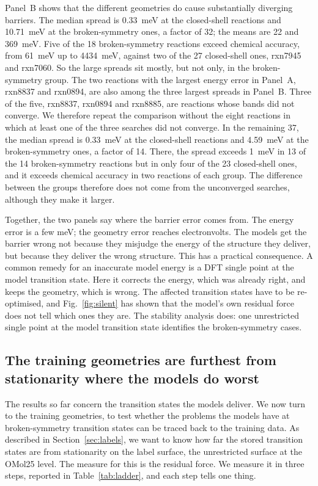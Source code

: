 Panel~B shows that the different geometries do cause substantially
diverging barriers. The median spread is 0.33~meV at the closed-shell
reactions and 10.71~meV at the broken-symmetry ones, a factor of 32; the
means are 22 and 369~meV. Five of the 18 broken-symmetry reactions exceed
chemical accuracy, from 61~meV up to 4434~meV, against two of the 27
closed-shell ones, rxn7945 and rxn7060. So the large spreads sit
mostly, but not only, in the broken-symmetry group. The two reactions with the
largest energy error in Panel~A, rxn8837 and rxn0894, are also among the
three largest spreads in Panel~B. Three of the five, rxn8837, rxn0894
and rxn8885, are reactions whose bands did not converge. We therefore
repeat the comparison without the eight reactions in which at least one
of the three searches did not converge. In the remaining 37, the median
spread is 0.33~meV at the closed-shell reactions and 4.59~meV at the
broken-symmetry ones, a factor of 14. There, the spread exceeds 1~meV in
13 of the 14 broken-symmetry reactions but in only four of the 23
closed-shell ones, and it exceeds chemical accuracy in two reactions of
each group. The difference between the groups therefore does not come
from the unconverged searches, although they make it larger.

Together, the two panels say where the barrier error comes from. The energy
error is a few meV; the geometry error reaches electronvolts. The
models get the barrier wrong not because they misjudge the energy of
the structure they deliver, but because they deliver the wrong
structure. This has a practical consequence. A common
remedy for an inaccurate model energy is a DFT single point at the model
transition state. Here it corrects the energy, which was already right, and
keeps the geometry, which is wrong. The affected transition states have to
be re-optimised, and Fig.~\ref{fig:silent} has shown that the model's own
residual force does not tell which ones they are. The stability
analysis does: one unrestricted single point at the model transition
state identifies the broken-symmetry cases.

\subsection{The training geometries are furthest from stationarity where the models do worst}

The results so far concern the transition states the models deliver.
We now turn to the training geometries, to test whether the problems
the models have at broken-symmetry transition states can be traced back
to the training data. As described in Section~\ref{sec:labels}, we want
to know how far the stored transition states are from stationarity on
the label surface, the unrestricted surface at the OMol25 level. The
measure for this is the residual force. We measure it in three steps,
reported in Table~\ref{tab:ladder}, and each step tells one thing.

